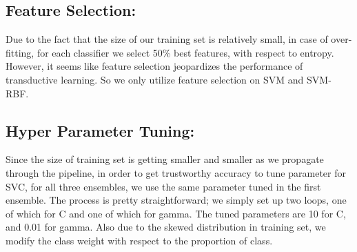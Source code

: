 \subsection{Feature Selection:}
Due to the fact that the size of our training set is relatively small, in case of over-fitting, for each classifier we select 50\% best features, with respect to entropy. However, it seems like feature selection jeopardizes the performance of transductive learning. So we only utilize feature selection on SVM and SVM-RBF.

\subsection{Hyper Parameter Tuning:}
Since the size of training set is getting smaller and smaller as we propagate through the pipeline, in order to get trustworthy accuracy to tune parameter for SVC, for all three ensembles, we use the same parameter tuned in the first ensemble. The process is pretty straightforward; we simply set up two loops, one of which for C and one of which for gamma. The tuned parameters are 10 for C, and 0.01 for gamma. Also due to the skewed distribution in training set, we modify the class weight with respect to the proportion of class. 


